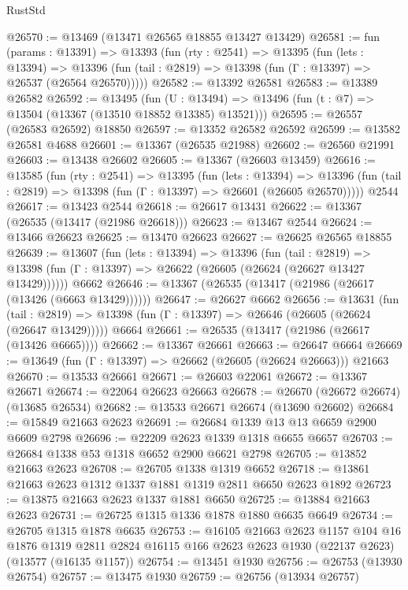 \begin{lexlean}{RustStd}
\begin{coremodule}
@26570 := @13469 (@13471 @26565 @18855 @13427 @13429)
@26581 := fun (params : @13391) =>
  @13393
    (fun (rty : @2541) =>
    @13395
      (fun (lets : @13394) =>
      @13396 (fun (tail : @2819) => @13398 (fun (Γ : @13397) => @26537 (@26564 @26570)))))
@26582 := @13392 @26581
@26583 := @13389 @26582
@26592 := @13495
    (fun (U : @13494) => @13496 (fun (t : @7) => @13504 (@13367 (@13510 @18852 @13385) @13521)))
@26595 := @26557 (@26583 @26592) @18850
@26597 := @13352 @26582 @26592
@26599 := @13582 @26581 @4688
@26601 := @13367 (@26535 @21988)
@26602 := @26560 @21991
@26603 := @13438 @26602
@26605 := @13367 (@26603 @13459)
@26616 := @13585
    (fun (rty : @2541) =>
    @13395
      (fun (lets : @13394) =>
      @13396 (fun (tail : @2819) => @13398 (fun (Γ : @13397) => @26601 (@26605 @26570)))))
    @2544
@26617 := @13423 @2544
@26618 := @26617 @13431
@26622 := @13367 (@26535 (@13417 (@21986 @26618)))
@26623 := @13467 @2544
@26624 := @13466 @26623
@26625 := @13470 @26623
@26627 := @26625 @26565 @18855
@26639 := @13607
    (fun (lets : @13394) =>
    @13396
      (fun (tail : @2819) =>
      @13398 (fun (Γ : @13397) => @26622 (@26605 (@26624 (@26627 @13427 @13429))))))
    @6662
@26646 := @13367 (@26535 (@13417 (@21986 (@26617 (@13426 (@6663 @13429))))))
@26647 := @26627 @6662
@26656 := @13631
    (fun (tail : @2819) => @13398 (fun (Γ : @13397) => @26646 (@26605 (@26624 (@26647 @13429)))))
    @6664
@26661 := @26535 (@13417 (@21986 (@26617 (@13426 @6665))))
@26662 := @13367 @26661
@26663 := @26647 @6664
@26669 := @13649 (fun (Γ : @13397) => @26662 (@26605 (@26624 @26663))) @21663
@26670 := @13533 @26661
@26671 := @26603 @22061
@26672 := @13367 @26671
@26674 := @22064 @26623 @26663
@26678 := @26670 (@26672 @26674) (@13685 @26534)
@26682 := @13533 @26671 @26674 (@13690 @26602)
@26684 := @15849 @21663 @2623
@26691 := @26684 @1339 @13 @13 @6659 @2900 @6609 @2798
@26696 := @22209 @2623 @1339 @1318 @6655 @6657
@26703 := @26684 @1338 @53 @1318 @6652 @2900 @6621 @2798
@26705 := @13852 @21663 @2623
@26708 := @26705 @1338 @1319 @6652
@26718 := @13861 @21663 @2623 @1312 @1337 @1881 @1319 @2811 @6650 @2623 @1892
@26723 := @13875 @21663 @2623 @1337 @1881 @6650
@26725 := @13884 @21663 @2623
@26731 := @26725 @1315 @1336 @1878 @1880 @6635 @6649
@26734 := @26705 @1315 @1878 @6635
@26753 := @16105
    @21663
    @2623
    @1157
    @104
    @16
    @1876
    @1319
    @2811
    @2824
    @16115
    @166
    @2623
    @2623
    @1930
    (@22137 @2623)
    (@13577 (@16135 @1157))
@26754 := @13451 @1930
@26756 := @26753 (@13930 @26754)
@26757 := @13475 @1930
@26759 := @26756 (@13934 @26757)

\end{coremodule}
\end{lexlean}
